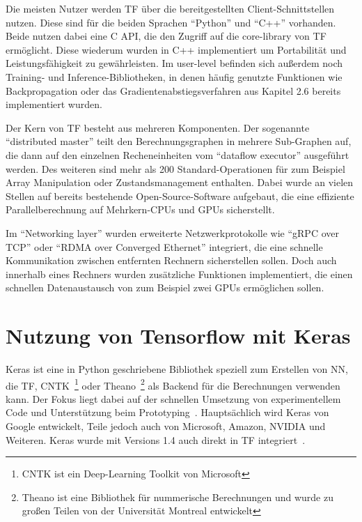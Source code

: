 Die meisten Nutzer werden \gls{TF} über die bereitgestellten Client-Schnittstellen nutzen. Diese sind für die beiden Sprachen "`Python"' und "`C++"' vorhanden. Beide nutzen dabei eine C API, die den Zugriff auf die core-library von \gls{TF} ermöglicht. Diese wiederum wurden in C++ implementiert um Portabilität und Leistungsfähigkeit zu gewährleisten. Im user-level befinden sich außerdem noch Training- und Inference-Bibliotheken, in denen häufig genutzte Funktionen wie Backpropagation oder das Gradientenabstiegsverfahren aus
Kapitel 2.6 bereits implementiert wurden.

Der Kern von \gls{TF} besteht aus mehreren Komponenten. Der sogenannte "`distributed master"' teilt den Berechnungsgraphen in mehrere Sub-Graphen auf, die dann auf den einzelnen Recheneinheiten vom "`dataflow executor"' ausgeführt werden. Des weiteren sind mehr als 200 Standard-Operationen für zum Beispiel Array Manipulation oder Zustandsmanagement enthalten. Dabei wurde an vielen Stellen auf bereits bestehende Open-Source-Software aufgebaut, die eine effiziente Parallelberechnung auf Mehrkern-CPUs und GPUs sicherstellt.

Im "`Networking layer"' wurden erweiterte Netzwerkprotokolle wie "`gRPC over TCP"' oder "`RDMA over Converged Ethernet"' integriert, die eine schnelle Kommunikation zwischen entfernten Rechnern sicherstellen sollen. Doch auch innerhalb eines Rechners wurden zusätzliche Funktionen implementiert, die einen schnellen Datenaustausch von zum Beispiel zwei GPUs ermöglichen sollen.

\section{Nutzung von Tensorflow mit Keras}

Keras ist eine in Python geschriebene Bibliothek speziell zum Erstellen von \gls{NN}, die \gls{TF}, CNTK~\footnote{CNTK ist ein Deep-Learning Toolkit von Microsoft} oder Theano~\footnote{Theano ist eine Bibliothek für nummerische Berechnungen und wurde zu großen Teilen von der Universität Montreal entwickelt} als Backend für die Berechnungen verwenden kann. Der Fokus liegt dabei auf der schnellen Umsetzung von experimentellem Code und Unterstützung beim Prototyping~\cite{keras}. Hauptsächlich wird Keras von Google entwickelt, Teile jedoch auch von Microsoft, Amazon, NVIDIA und Weiteren. Keras wurde mit Versions 1.4 auch direkt in \gls{TF} integriert~\cite{tfRelease}.

